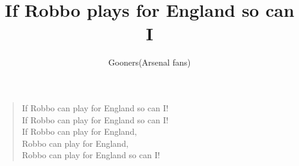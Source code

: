 \documentclass[a4paper,12pt]{article}
\title{If Robbo plays for England so can I}
\author{Gooners(Arsenal fans)}
\date{}
\begin{document}
	
	\maketitle
	
	\begin{verse}
		
		If Robbo can play for England so can I! \\
		If Robbo can play for England so can I! \\
		If Robbo can play for England, \\
		Robbo can play for England, \\
		Robbo can play for England so can I!
		
	\end{verse}
	
\end{document}
